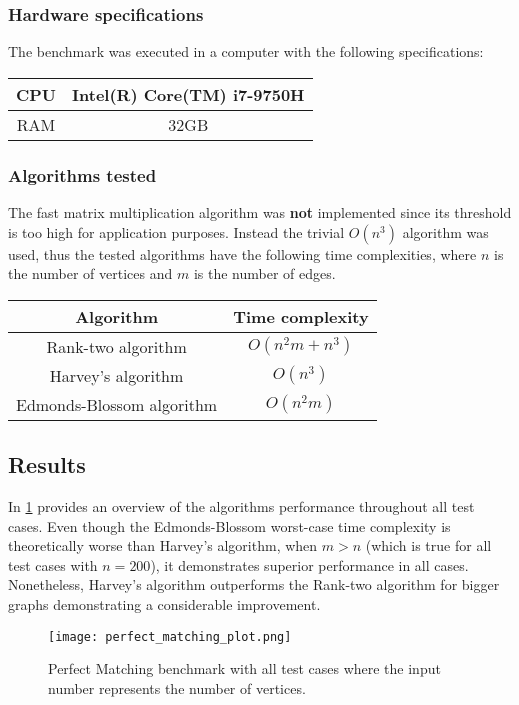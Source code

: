 \subsubsection{Hardware specifications}

\noindent
The benchmark was executed in a computer with the following specifications:

\begin{center}
  \begin{tabular}{|c|c|}
    \hline
    CPU & Intel(R) Core(TM) i7-9750H \\
    \hline
    RAM & 32GB \\ 
    \hline
  \end{tabular}
\end{center}

\subsubsection{Algorithms tested}
The fast matrix multiplication algorithm was \textbf{not} implemented since its threshold is too high for application purposes.
Instead the trivial $O(n^3)$ algorithm was used, thus the tested algorithms have the following time complexities, where \(n\) is the number of vertices and \(m\) is the number of edges.
\begin{center}
  \begin{tabular}{|c|c|}
    \hline
    Algorithm & Time complexity \\
    \hline
    Rank-two algorithm & \(O(n^2m + n^3)\) \\
    Harvey's algorithm & \(O(n^3)\) \\
    Edmonds-Blossom algorithm & \(O(n^2m)\) \\
    \hline
  \end{tabular}
\end{center}

\subsection{Results}
\label{results:perfect_matching}

In \cref{fig:perf_matching} provides an overview of the algorithms performance throughout all test cases.
Even though the Edmonds-Blossom worst-case time complexity is theoretically worse than Harvey's algorithm, when \(m > n\) (which is true for all test cases with \(n = 200\)), 
it demonstrates superior performance in all cases.
Nonetheless, Harvey's algorithm outperforms the Rank-two algorithm for bigger graphs demonstrating a considerable improvement.
\begin{figure}[h]
  \centering
  \texttt{[image: perfect\_matching\_plot.png]}
  \caption{Perfect Matching benchmark with all test cases where the input number represents the number of vertices.}
  \label{fig:perf_matching}
\end{figure}

